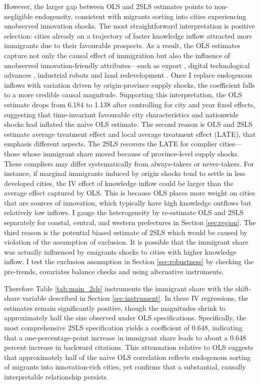\documentclass[12pt]{article}
\begin{document}
However, the larger gap between OLS and 2SLS estimates points to non-negligible endogeneity, consistent with migrants sorting into cities experiencing unobserved innovation shocks. The most straightforward interpretation is positive selection: cities already on a trajectory of faster knowledge inflow attracted more immigrants due to their favourable prospects. As a result, the OLS estimates capture not only the causal effect of immigration but also the influence of unobserved innovation-friendly attributes—such as export \citep{pengEffectsExportGrowth2025}, digital technological advances \citep{luDigitalEconomyUrban2025}, industrial robots \citep{bianEffectsRobotsInternal2024} and land redevelopment \citep{wangLandRedevelopmentMigrant2023}.
Once I replace endogenous inflows with variation driven by origin-province supply shocks, the coefficient falls to a more credible causal magnitude. Supporting this interpretation, the OLS estimate drops from 6.184 to 1.138 after controlling for city and year fixed effects, suggesting that time-invariant favourable city characteristics and nationwide shocks had inflated the naive OLS estimate.
The second reason is OLS and 2SLS estimate average treatment effect and local average treatment effect (LATE), that emphasis different aspects. The 2SLS recovers the LATE for complier cities—those whose immigrant share moved because of province-level supply shocks. These compliers may differ systematically from always-takers or never-takers. For instance, if marginal immigrants induced by origin shocks tend to settle in less developed cities, the IV effect of knowledge inflow could be larger than the average effect captured by OLS. This is because OLS places more weight on cities that are sources of innovation, which typically have high knowledge outflows but relatively low inflows. I gauge the heterogeneity by re-estimate OLS and 2SLS separately for coastal, central, and western prefectures in Section \ref{sec:region}.
The third reason is the potential biased estimate of 2SLS which would be caused by violation of the assumption of exclusion. It is possible that the immigrant share was actually influenced by emigrants shocks to cities with higher knowledge inflow. I test the exclusion assumption in Section \ref{sec:robustness} by checking the pre-trends, covariates balance checks and using alternative instruments.

Therefore Table \ref{tab:main_2sls} instruments the immigrant share with the shift-share variable described in Section \ref{sec:instrument}.
In these IV regressions, the estimates remain significantly positive, though the magnitudes shrink to approximately half the size observed under OLS specifications. Specifically, the most comprehensive 2SLS specification yields a coefficient of 0.648, indicating that a one-percentage-point increase in immigrant share leads to about a 0.648 percent increase in backward citations. This attenuation relative to OLS suggests that approximately half of the naive OLS correlation reflects endogenous sorting of migrants into innovation-rich cities, yet confirms that a substantial, causally interpretable relationship persists.
\end{document}
